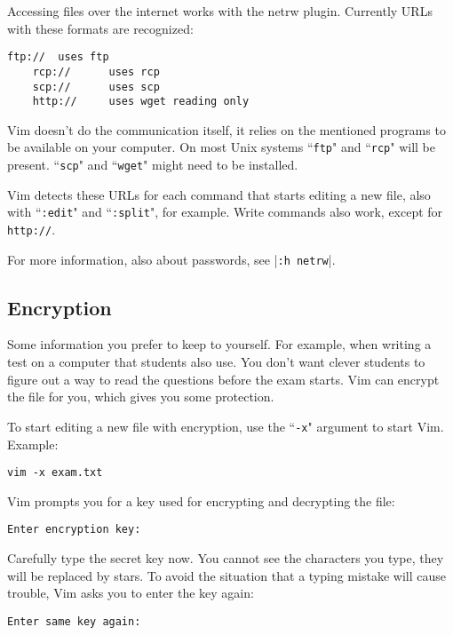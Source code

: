 Accessing files over the internet works with the netrw plugin.
Currently URLs with these formats are recognized:

\begin{Verbatim}[samepage=true]
    ftp:// 	uses ftp
    rcp://      uses rcp
    scp://      uses scp
    http:// 	uses wget reading only
\end{Verbatim}

Vim doesn't do the communication itself, it relies on the mentioned programs to be available on your computer.
On most Unix systems ``\texttt{ftp}" and ``\texttt{rcp}" will be present.
``\texttt{scp}" and ``\texttt{wget}" might need to be installed.

Vim detects these URLs for each command that starts editing a new file, also with ``\texttt{:edit}" and ``\texttt{:split}", for example.
Write commands also work, except for \texttt{http://}.

For more information, also about passwords, see |\texttt{:h netrw}|.
\subsection{Encryption}
Some information you prefer to keep to yourself.
For example, when writing a test on a computer that students also use.
You don't want clever students to figure out a way to read the questions before the exam starts.
Vim can encrypt the file for you, which gives you some protection.

To start editing a new file with encryption, use the ``\texttt{-x}" argument to start Vim.
Example:

\begin{Verbatim}[samepage=true]
 vim -x exam.txt
\end{Verbatim}

Vim prompts you for a key used for encrypting and decrypting the file:

\begin{Verbatim}[samepage=true]
    Enter encryption key:
\end{Verbatim}

Carefully type the secret key now.
You cannot see the characters you type, they will be replaced by stars.
To avoid the situation that a typing mistake will cause trouble, Vim asks you to enter the key again:

\begin{Verbatim}[samepage=true]
    Enter same key again:
\end{Verbatim}

